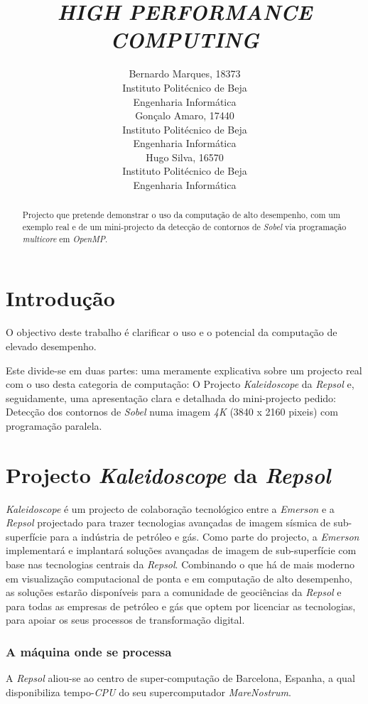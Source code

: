 \documentclass{article}
\title{\textit{HIGH PERFORMANCE COMPUTING}}
\author{{\hspace{1mm}Bernardo Marques, 18373}\\
	Instituto Politécnico de Beja\\
	Engenharia Informática\\
	\And
	{\hspace{1mm}Gonçalo Amaro, 17440} \\
	Instituto Politécnico de Beja\\
	Engenharia Informática\\
	\And
	{\hspace{1mm}Hugo Silva, 16570} \\
	Instituto Politécnico de Beja\\
	Engenharia Informática\\
}
\begin{document}
\maketitle

\begin{abstract}
Projecto que pretende demonstrar o uso da computação de alto desempenho, com um exemplo real e de um mini-projecto da detecção de contornos de \textit{Sobel} via programação \textit{multicore} em \textit{OpenMP}. 
\end{abstract}


\section{Introdução}
O objectivo deste trabalho é clarificar o uso e o potencial da computação de elevado desempenho.

Este divide-se em duas partes: uma meramente explicativa sobre um projecto real com o uso desta categoria de computação: O Projecto \textit{Kaleidoscope} da \textit{Repsol} e, seguidamente, uma apresentação clara e detalhada do mini-projecto pedido: Detecção dos contornos de \textit{Sobel} numa imagem \textit{4K} (3840 x 2160 pixeis) com programação paralela.

\section{Projecto \textit{Kaleidoscope} da \textit{Repsol}}
\textit{Kaleidoscope} é um projecto de colaboração tecnológico entre a \textit{Emerson} e a \textit{Repsol} projectado para trazer tecnologias avançadas de imagem sísmica de sub-superfície para a indústria de petróleo e gás. Como parte do projecto, a \textit{Emerson} implementará e implantará soluções avançadas de imagem de sub-superfície com base nas tecnologias centrais da \textit{Repsol}. Combinando o que há de mais moderno em visualização computacional de ponta e em computação de alto desempenho, as soluções estarão disponíveis para a comunidade de geociências da \textit{Repsol} e para todas as empresas de petróleo e gás que optem por licenciar as tecnologias, para apoiar os seus processos de transformação digital.

\subsubsection{A máquina onde se processa}
A \textit{Repsol} aliou-se ao centro de super-computação de Barcelona, Espanha, a qual disponibiliza tempo-\textit{CPU} do seu supercomputador \textit{MareNostrum}.
\end{document}
